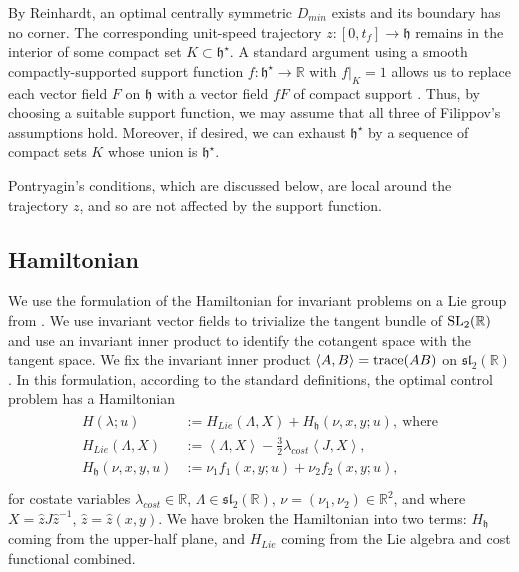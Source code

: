 \documentclass{article}
\theoremstyle{remark}
\newcommand{\ring}[1]{\mathbb{#1}}
\newcommand{\op}[1]{\hbox{#1}}
\newcommand{\ang}[1]{\left\langle{#1}\right\rangle}
\def\sl{\mathfrak{sl}_2(\ring{R})}
\def\SL{\op{SL}_2(\ring{R})}
\def\h{\mathfrak h}
\def\hstar{{\mathfrak h}^\star}
\def\Hlie{H_{Lie}}
\def\DR{D_{min}}
\begin{document}
By Reinhardt, an optimal centrally symmetric $\DR$ exists and its
boundary has no corner.  The corresponding unit-speed trajectory
$z:[0,t_f]\to\h$ remains in the interior of some compact set $K\subset
\hstar$.  A standard argument using a smooth compactly-supported
support function $f:\hstar\to \ring{R}$ with $f|_K = 1$ allows us to
replace each vector field $F$ on $\h$ with a vector field $f F$ of
compact support \cite[Remark 10.5]{agrachev2013control}.  Thus, by
choosing a suitable support function, we may assume that all three of
Filippov's assumptions hold.  Moreover, if desired, we can exhaust
$\hstar$ by a sequence of compact sets $K$ whose union is $\hstar$.

Pontryagin's conditions, which are discussed below, are
local around the trajectory $z$, and so are not affected by the
support function.





\subsection{Hamiltonian}\label{sec:ham}


We use the formulation of the Hamiltonian for invariant problems on a
Lie group from \cite[Ch.18]{agrachev2013control}.  We
use invariant vector fields to trivialize the tangent bundle of $\SL$
and use an invariant inner product to identify the cotangent space
with the tangent space.  We fix the invariant inner product $\ang{A,B}
= \op{trace}(AB)$ on $\sl$.  In this formulation, according to the standard
definitions,  the optimal control
problem has a Hamiltonian
\begin{align}\label{eqn:ham}
\begin{split}
H(\lambda;u)&:=
\Hlie(\Lambda,X) + H_{\h}(\nu,x,y;u), 
~\text{where}\\
\Hlie(\Lambda,X) &:= 
\ang{\Lambda,X} - \frac{3}{2} \lambda_{cost} \ang{J,X},\\
H_{\h}(\nu,x,y,u)&:= 
\nu_1 f_1(x,y;u) + \nu_2 f_2(x,y;u),\\
\end{split}
\end{align}
 for
costate variables $\lambda_{cost}\in\ring{R}$, $\Lambda\in \sl$, 
$\nu=(\nu_1,\nu_2)\in\ring{R}^2$,
and where $X = \hat z J \hat z^{-1}$, $\hat z = \hat z(x,y)$.  We
have broken the Hamiltonian into two terms: $H_{\h}$ coming from the
upper-half plane, and $\Hlie$ coming from the Lie algebra and cost
functional combined.
\end{document}
